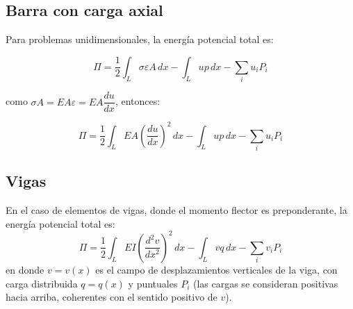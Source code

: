 \subsection{Barra con carga axial}

Para problemas unidimensionales, la energía potencial total es:

\begin{equation}
	\Pi = \dfrac{1}{2} \int_L \sigma \varepsilon A \, dx - \int_L up\, dx - \sum_i u_i P_i
	\label{eq:energia_unidimensionales}
\end{equation}

como $\sigma A = EA \varepsilon = EA \dfrac{du}{dx}$, entonces:

\begin{equation}
	\boxed{\Pi = \dfrac{1}{2} \int_L EA \left( \dfrac{du}{dx} \right)^2 \, dx - \int_L up\, dx - \sum_i u_i P_i}
	\label{eq:eptuni}
\end{equation}

\subsection{Vigas}

En el caso de elementos de vigas, donde el momento flector es preponderante, la energía potencial total es:
\begin{equation}
	\boxed{\Pi = \frac{1}{2} \int_L EI \left(\frac{d^2v}{dx^2}\right)^2 \, dx - \int_L vq \, dx - \sum_i v_iP_i}
	\label{eq:energia-vigas}
\end{equation}
en donde $v = v(x)$ es el campo de desplazamientos verticales de la viga, con carga 
distribuida $q = q(x)$ y puntuales $P_i$ (las cargas se consideran positivas hacia 
arriba, coherentes con el sentido positivo de $v$).

